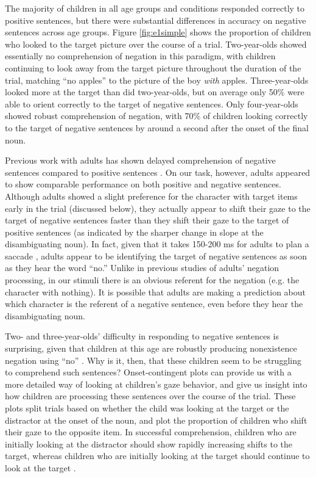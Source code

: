 \documentclass[man]{apa2}
\begin{document}
The majority of children in all age groups and conditions responded correctly to positive sentences, but there were substantial differences in accuracy on negative sentences across age groups. Figure \ref{fig:e1simple} shows the proportion of children who looked to the target picture over the course of a trial. Two-year-olds showed essentially no comprehension of negation in this paradigm, with children continuing to look away from the target picture throughout the duration of the trial, matching ``no apples'' to the picture of the boy \emph{with} apples.  Three-year-olds looked more at the target than did two-year-olds, but on average only 50\% were able to orient correctly to the target of negative sentences.  Only four-year-olds showed robust comprehension of negation, with 70\% of children looking correctly to the target of negative sentences by around a second after the onset of the final noun.  

Previous work with adults has shown delayed comprehension of negative sentences compared to positive sentences \cite{hclark1972, just1971, just1976, carpenter1975}.  On our task, however, adults appeared to show comparable performance on both positive and negative sentences.  Although adults showed a slight preference for the character with target items early in the trial (discussed below), they actually appear to shift their gaze to the target of negative sentences faster than they shift their gaze to the target of positive sentences (as indicated by the sharper change in slope at the disambiguating noun).  In fact, given that it takes 150-200 ms for adults to plan a saccade \cite{allopenna1998, rayner1998}, adults appear to be identifying the target of negative sentences as soon as they hear the word ``no.''  Unlike in previous studies of adults' negation processing, in our stimuli there is an obvious referent for the negation (e.g. the character with nothing).  It is possible that adults are making a prediction about which character is the referent of a negative sentence, even before they hear the disambiguating noun.   

Two- and three-year-olds' difficulty in responding to negative sentences is surprising, given that children at this age are robustly producing nonexistence negation using ``no'' \cite{bloom1970, pea1980}.  Why is it, then, that these children seem to be struggling to comprehend such sentences?  Onset-contingent plots can provide us with a more detailed way of looking at children's gaze behavior, and give us insight into how children are processing these sentences over the course of the trial.  These plots split trials based on whether the child was looking at the target or the distractor at the onset of the noun, and plot the proportion of children who shift their gaze to the opposite item.  In successful comprehension, children who are initially looking at the distractor should show rapidly increasing shifts to the target, whereas children who are initially looking at the target should continue to look at the target \cite{fernald2008}.  
\end{document}
